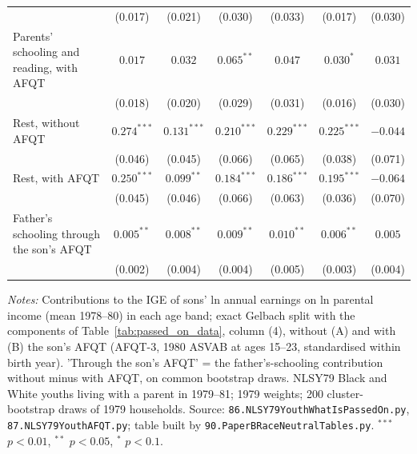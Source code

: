 \begin{table}[!htbp]
{{\begin{tabular}{lcccccc}
 & (0.017) & (0.021) & (0.030) & (0.033) & (0.017) & (0.030) \\
Parents' schooling and reading, with AFQT & $0.017$ & $0.032$ & $0.065^{**}$ & $0.047$ & $0.030^{*}$ & $0.031$ \\
 & (0.018) & (0.020) & (0.029) & (0.031) & (0.016) & (0.030) \\
Rest, without AFQT & $0.274^{***}$ & $0.131^{***}$ & $0.210^{***}$ & $0.229^{***}$ & $0.225^{***}$ & $-0.044$ \\
 & (0.046) & (0.045) & (0.066) & (0.065) & (0.038) & (0.071) \\
Rest, with AFQT & $0.250^{***}$ & $0.099^{**}$ & $0.184^{***}$ & $0.186^{***}$ & $0.195^{***}$ & $-0.064$ \\
 & (0.045) & (0.046) & (0.066) & (0.063) & (0.036) & (0.070) \\
Father's schooling through the son's AFQT & $0.005^{**}$ & $0.008^{**}$ & $0.009^{**}$ & $0.010^{**}$ & $0.006^{**}$ & $0.005$ \\
 & (0.002) & (0.004) & (0.004) & (0.005) & (0.003) & (0.004) \\
\bottomrule
\end{tabular}}}
\par\smallskip
\begin{minipage}{\textwidth}\footnotesize \textit{Notes:} Contributions to the IGE of sons' ln annual earnings on ln parental income (mean 1978--80) in each age band; exact Gelbach split with the components of Table~\ref{tab:passed_on_data}, column (4), without (A) and with (B) the son's AFQT (AFQT-3, 1980 ASVAB at ages 15--23, standardised within birth year). 'Through the son's AFQT' = the father's-schooling contribution without minus with AFQT, on common bootstrap draws. NLSY79 Black and White youths living with a parent in 1979--81; 1979 weights; 200 cluster-bootstrap draws of 1979 households. Source: \texttt{86.NLSY79YouthWhatIsPassedOn.py}, \texttt{87.NLSY79YouthAFQT.py}; table built by \texttt{90.PaperBRaceNeutralTables.py}. $^{***}$ $p<0.01$, $^{**}$ $p<0.05$, $^{*}$ $p<0.1$.\end{minipage}
\end{table}
